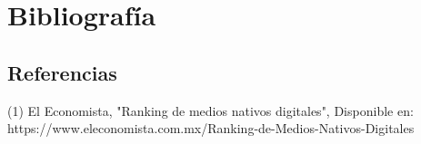 

\chapter{Bibliografía}

\section{Referencias}

(1) El Economista, "Ranking de medios nativos digitales", Disponible en: https://www.eleconomista.com.mx/Ranking-de-Medios-Nativos-Digitales

